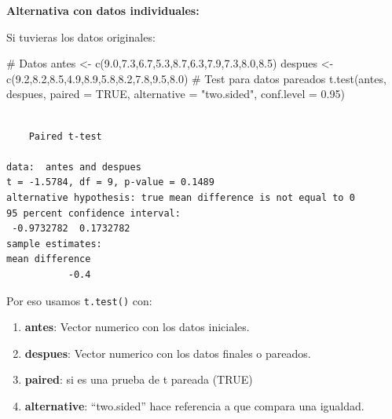 \documentclass[
  spanish,
  letterpaper,
]{book}
\newenvironment{Shaded}{\begin{snugshade}}{\end{snugshade}}
\newcommand{\AttributeTok}[1]{\textcolor[rgb]{0.40,0.45,0.13}{#1}}
\newcommand{\CommentTok}[1]{\textcolor[rgb]{0.37,0.37,0.37}{#1}}
\newcommand{\ConstantTok}[1]{\textcolor[rgb]{0.56,0.35,0.01}{#1}}
\newcommand{\FloatTok}[1]{\textcolor[rgb]{0.68,0.00,0.00}{#1}}
\newcommand{\FunctionTok}[1]{\textcolor[rgb]{0.28,0.35,0.67}{#1}}
\newcommand{\NormalTok}[1]{\textcolor[rgb]{0.00,0.23,0.31}{#1}}
\newcommand{\OtherTok}[1]{\textcolor[rgb]{0.00,0.23,0.31}{#1}}
\newcommand{\StringTok}[1]{\textcolor[rgb]{0.13,0.47,0.30}{#1}}
\begin{document}
\textbf{Alternativa con datos individuales:}

Si tuvieras los datos originales:

\begin{Shaded}
\begin{Highlighting}[]
\CommentTok{\# Datos}
\NormalTok{antes }\OtherTok{\textless{}{-}} \FunctionTok{c}\NormalTok{(}\FloatTok{9.0}\NormalTok{,}\FloatTok{7.3}\NormalTok{,}\FloatTok{6.7}\NormalTok{,}\FloatTok{5.3}\NormalTok{,}\FloatTok{8.7}\NormalTok{,}\FloatTok{6.3}\NormalTok{,}\FloatTok{7.9}\NormalTok{,}\FloatTok{7.3}\NormalTok{,}\FloatTok{8.0}\NormalTok{,}\FloatTok{8.5}\NormalTok{)}
\NormalTok{despues }\OtherTok{\textless{}{-}} \FunctionTok{c}\NormalTok{(}\FloatTok{9.2}\NormalTok{,}\FloatTok{8.2}\NormalTok{,}\FloatTok{8.5}\NormalTok{,}\FloatTok{4.9}\NormalTok{,}\FloatTok{8.9}\NormalTok{,}\FloatTok{5.8}\NormalTok{,}\FloatTok{8.2}\NormalTok{,}\FloatTok{7.8}\NormalTok{,}\FloatTok{9.5}\NormalTok{,}\FloatTok{8.0}\NormalTok{)}
\CommentTok{\# Test para datos pareados}
\FunctionTok{t.test}\NormalTok{(antes, despues,}
       \AttributeTok{paired =} \ConstantTok{TRUE}\NormalTok{,}
       \AttributeTok{alternative =} \StringTok{"two.sided"}\NormalTok{,}
       \AttributeTok{conf.level =} \FloatTok{0.95}\NormalTok{)}
\end{Highlighting}
\end{Shaded}

\begin{verbatim}

    Paired t-test

data:  antes and despues
t = -1.5784, df = 9, p-value = 0.1489
alternative hypothesis: true mean difference is not equal to 0
95 percent confidence interval:
 -0.9732782  0.1732782
sample estimates:
mean difference 
           -0.4 
\end{verbatim}

Por eso usamos \texttt{t.test()} con:

\begin{enumerate}
\def\labelenumi{\arabic{enumi}.}
\item
  \textbf{antes}: Vector numerico con los datos iniciales.
\item
  \textbf{despues}: Vector numerico con los datos finales o pareados.
\item
  \textbf{paired}: si es una prueba de t pareada (TRUE)
\item
  \textbf{alternative}: ``two.sided'' hace referencia a que compara una
  igualdad.
\end{enumerate}
\end{document}
